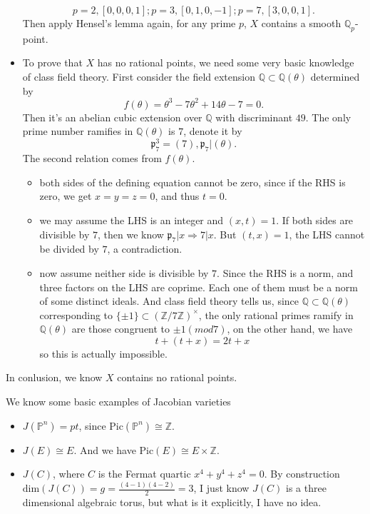\documentclass[../main.tex]{subfiles}
\begin{document}
\begin{example}
\begin{itemize}
$$p=2, [0,0,0,1]; p=3, [0,1,0,-1]; p=7, [3,0,0,1].$$
Then apply Hensel's lemma again, for any prime $p$, $X$ contains a smooth $\mathbb{Q}_{p}$-point.
\item To prove that $X$ has no rational points, we need some very basic knowledge of class field theory. First consider the field extension $\mathbb{Q}\subset \mathbb{Q}(\theta)$ determined by
$$f(\theta)=\theta^{3}-7\theta^{2}+14\theta-7=0.$$
Then it's an abelian cubic extension over $\mathbb{Q}$ with discriminant $49$. The only prime number ramifies in $\mathbb{Q}(\theta)$ is $7$, denote it by 
$$\mathfrak{p}_{7}^{3}=(7), \mathfrak{p}_{7}|(\theta).$$
The second relation comes from $f(\theta)$. 
\begin{itemize}
\item both sides of the defining equation cannot be zero, since if the RHS is zero, we get $x=y=z=0$, and thus $t=0$.
\item we may assume the LHS is an integer and $(x,t)=1$. If both sides are divisible by $7$, then we know $\mathfrak{p}_{7}|x\Rightarrow 7|x.$
But $(t,x)=1$, the LHS cannot be divided by $7$, a contradiction.
\item now assume neither side is divisible by $7$. Since the RHS is a norm, and three factors on the LHS are coprime. Each one of them must be a norm of some distinct ideals. And class field theory tells us, since $\mathbb{Q}\subset \mathbb{Q}(\theta)$ corresponding to $\{\pm 1\}\subset (\mathbb{Z}/7\mathbb{Z})^{\times}$, the only rational primes ramify in $\mathbb{Q}(\theta)$ are those congruent to $\pm 1(mod 7)$, on the other hand, we have
$$t+(t+x)=2t+x$$
so this is actually impossible.
\end{itemize}
\end{itemize}
In conlusion, we know $X$ contains no rational points.
\end{example}
\begin{example}
We know some basic examples of Jacobian varieties
\begin{itemize}
\item $J(\mathbb{P}^{n})=pt$, since $\mathrm{Pic}(\mathbb{P}^{n})\cong \mathbb{Z}$.
\item $J(E)\cong E$. And we have $\mathrm{Pic}(E)\cong E\times \mathbb{Z}.$
\item $J(C)$, where $C$ is the Fermat quartic $x^{4}+y^{4}+z^{4}=0$. By construction $\mathrm{dim}(J(C))=g=\frac{(4-1)(4-2)}{2}=3$, I just know $J(C)$ is a three dimensional algebraic torus, but what is it explicitly, I have no idea.
\end{itemize}
\end{example}
\begin{remark}

\end{remark}
\begin{remark}

\end{remark}
\end{document}
